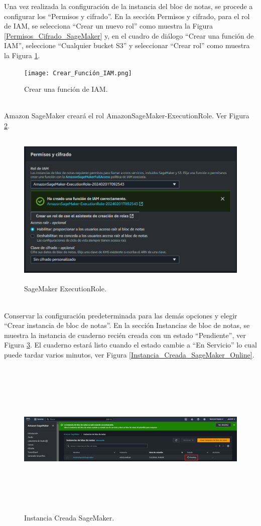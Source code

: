 \documentclass[a4paper,10pt, oneside, titlepage]{article}
\begin{document}
	\indent Una vez realizada la configuración de la instancia del bloc de notas, se procede a configurar los ``Permisos y cifrado''. En la sección Permisos y cifrado, para el rol de IAM, se selecciona ``Crear un nuevo rol'' como muestra la Figura \ref{Permisos_Cifrado_SageMaker} y, en el cuadro de diálogo ``Crear una función de IAM'', seleccione ``Cualquier bucket S3'' y seleccionar ``Crear rol'' como muestra la Figura \ref{Crear_Función_IAM}.
	\begin{figure}[!h]
		\centering
		\texttt{[image: Crear\_Función\_IAM.png]}
		\caption{Crear una función de IAM.}
		\label{Crear_Función_IAM}
	\end{figure} \\
	\indent Amazon SageMaker creará el rol AmazonSageMaker-ExecutionRole. Ver Figura \ref{SageMaker_ExecutionRole}.
	\begin{figure}[!h]
		\centering
		\includegraphics[width = 1\linewidth, height = 7.6cm]{SageMaker_ExecutionRole.png}
		\caption{SageMaker ExecutionRole.}
		\label{SageMaker_ExecutionRole}
	\end{figure} \\
	\indent Conservar la configuración predeterminada para las demás opciones y elegir ``Crear instancia de bloc de notas''. En la sección Instancias de bloc de notas, se muestra la instancia de cuaderno recién creada con un estado ``Pendiente'', ver Figura \ref{Instancia_Creada_SageMaker}. El cuaderno estará listo cuando el estado cambie a ``En Servicio'' lo cual puede tardar varios minutos, ver Figura \ref{Instancia_Creada_SageMaker_Online}.
	\begin{figure}[!h]
		\centering
		\includegraphics[width = 1\linewidth, height = 7.6cm]{Instancia_Creada_SageMaker.png}
		\caption{Instancia Creada SageMaker.}
		\label{Instancia_Creada_SageMaker}
	\end{figure}
\end{document}
